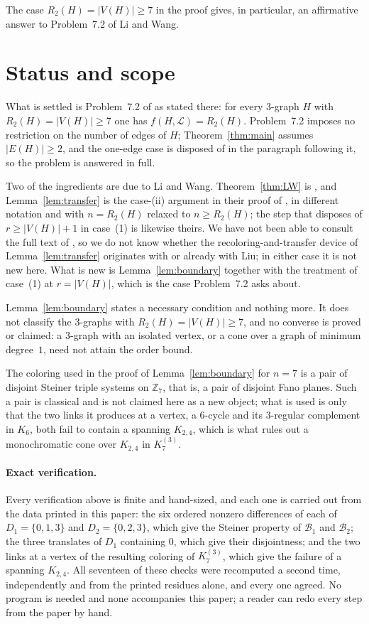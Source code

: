 \documentclass[11pt]{amsart}
\newcommand{\Lpath}{\mathcal L}
\newcommand{\Z}{\mathbb Z}
\begin{document}
The case $R_2(H)=|V(H)|\ge7$ in the proof gives, in particular, an
affirmative answer to Problem~7.2 of Li and Wang.

\section*{Status and scope}

What is settled is Problem~7.2 of \cite{LiWang} as stated there: for every
$3$-graph $H$ with $R_2(H)=|V(H)|\ge7$ one has $f(H,\Lpath)=R_2(H)$.
Problem~7.2 imposes no restriction on the number of edges of $H$;
Theorem~\ref{thm:main} assumes $|E(H)|\ge2$, and the one-edge case is
disposed of in the paragraph following it, so the problem is answered in
full.

Two of the ingredients are due to Li and Wang.
Theorem~\ref{thm:LW} is \cite[Theorem~1.5]{LiWang}, and
Lemma~\ref{lem:transfer} is the case-(ii) argument in their proof of
\cite[Theorem~1.10]{LiWang}, in different notation and with $n=R_2(H)$
relaxed to $n\ge R_2(H)$; the step that disposes of $r\ge|V(H)|+1$ in
case~(1) is likewise theirs. We have not been able to consult the full
text of \cite{Liu}, so we do not know whether the recoloring-and-transfer
device of Lemma~\ref{lem:transfer} originates with \cite{LiWang} or
already with Liu; in either case it is not new here. What is new is
Lemma~\ref{lem:boundary} together with the treatment of case~(1) at
$r=|V(H)|$, which is the case Problem~7.2 asks about.

Lemma~\ref{lem:boundary} states a necessary condition and nothing more. It
does not classify the $3$-graphs with $R_2(H)=|V(H)|\ge7$, and no converse
is proved or claimed: a $3$-graph with an isolated vertex, or a cone over a
graph of minimum degree~$1$, need not attain the order bound.

The coloring used in the proof of Lemma~\ref{lem:boundary} for $n=7$ is a
pair of disjoint Steiner triple systems on $\Z_7$, that is, a pair of
disjoint Fano planes. Such a pair is classical and is not claimed here as a
new object; what is used is only that the two links it produces at a
vertex, a $6$-cycle and its $3$-regular complement in $K_6$, both fail to
contain a spanning $K_{2,4}$, which is what rules out a monochromatic cone
over $K_{2,4}$ in $K_7^{(3)}$.

\paragraph{Exact verification.}
Every verification above is finite and hand-sized, and each one is carried out
from the data printed in this paper: the six ordered nonzero differences of
each of $D_1=\{0,1,3\}$ and $D_2=\{0,2,3\}$, which give the Steiner property
of $\mathcal B_1$ and $\mathcal B_2$; the three translates of $D_1$ containing
$0$, which give their disjointness; and the two links at a vertex of the
resulting coloring of $K_7^{(3)}$, which give the failure of a spanning
$K_{2,4}$. All seventeen of these checks were recomputed a second time,
independently and from the printed residues alone, and every one agreed. No
program is needed and none accompanies this paper; a reader can redo every
step from the paper by hand.
\end{document}
